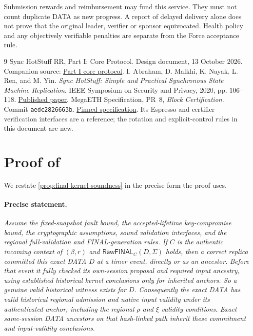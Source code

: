 \documentclass[11pt,a4paper]{article}
\newcommand{\tagg}[1]{\ensuremath{\mathsf{#1}}}
\newcounter{protocol}
\begin{document}
Submission rewards and reimbursement may fund this service. They must not
count duplicate DATA as new progress. A report of delayed delivery
alone does not prove that the original leader, verifier or sponsor
equivocated. Health policy and any objectively verifiable penalties
are separate from the Force acceptance rule.

\begingroup\small
\begin{thebibliography}{9}
Sync HotStuff RR, Part I: Core Protocol. Design document, 13 October 2026.
Companion source: \href{run:sync_hotstuff_rr_part1_core.tex}{Part I core protocol}.
I. Abraham, D. Malkhi, K. Nayak, L. Ren, and M. Yin.
\emph{Sync HotStuff: Simple and Practical Synchronous State Machine Replication}.
IEEE Symposium on Security and Privacy, 2020, pp. 106--118.
\href{https://conferences.computer.org/sp/pdfs/sp/2020/349700a106.pdf}{Published paper}.
MegaETH Specification, PR~8, \emph{Block Certification}.
Commit \texttt{aedc2826663b}.
\href{https://github.com/megaeth-labs/specification/tree/aedc2826663b134ee25d26bea17e70c6d23d321c/specs/block-certification}{Pinned specification}.
Its Espresso and certifier verification interfaces are a reference;
the rotation and explicit-control rules in this document are new.
\end{thebibliography}
\endgroup
\appendix
{}
\section{Proof of \texorpdfstring{}{the FINAL kernel proposition}}
\label{app:final-kernel-proof}
We restate \cref{prop:final-kernel-soundness} in the precise form the
proof uses.

\paragraph{Precise statement.}
\textit{Assume the fixed-snapshot fault bound, the accepted-lifetime
key-compromise bound, the cryptographic assumptions, sound validation
interfaces, and the regional full-validation and FINAL-generation rules.
If $C$ is the authentic incoming context of $(\beta,r)$ and
$\tagg{RawFINAL}_C(D,\Sigma)$ holds, then a correct replica committed
this exact DATA $D$ at a timer event, directly or as an ancestor. Before
that event it fully checked its own-session proposal and required input
ancestry, using established historical kernel conclusions only for
inherited anchors. So a genuine valid historical witness exists for $D$.
Consequently the exact DATA has valid historical regional admission and
native input validity under its authenticated anchor, including the
regional $\rho$ and $\xi$ validity conditions. Exact same-session DATA
ancestors on that hash-linked path inherit these commitment and
input-validity conclusions.}
\end{document}
